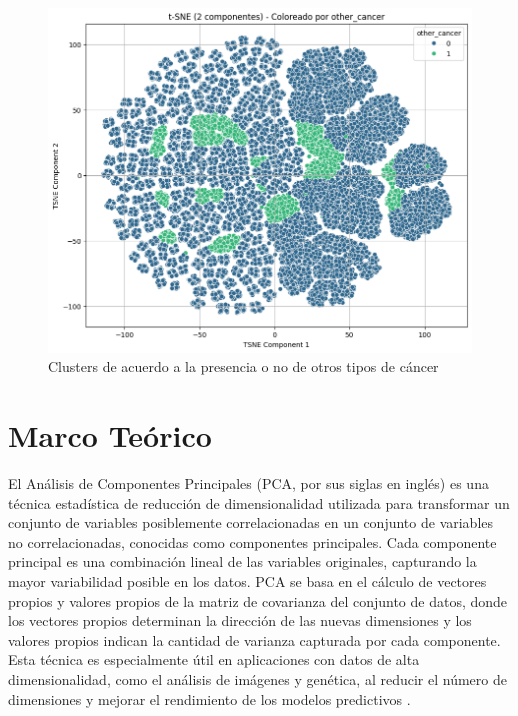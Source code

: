 \documentclass[10pt,journal,compsoc]{IEEEtran}
\begin{document}
\begin{figure}[htb]
    \centering
    \includegraphics[width=\linewidth]{imagenes/other_cancer.png}
    \caption{Clusters de acuerdo a la presencia o no de otros tipos de cáncer}
    \label{fig:tsne_other_cancer}
\end{figure}


\section{Marco Teórico}
El Análisis de Componentes Principales (PCA, por sus siglas en inglés) es una técnica estadística de reducción de dimensionalidad utilizada para transformar un conjunto de variables posiblemente correlacionadas en un conjunto de variables no correlacionadas, conocidas como componentes principales. Cada componente principal es una combinación lineal de las variables originales, capturando la mayor variabilidad posible en los datos. PCA se basa en el cálculo de vectores propios y valores propios de la matriz de covarianza del conjunto de datos, donde los vectores propios determinan la dirección de las nuevas dimensiones y los valores propios indican la cantidad de varianza capturada por cada componente. Esta técnica es especialmente útil en aplicaciones con datos de alta dimensionalidad, como el análisis de imágenes y genética, al reducir el número de dimensiones y mejorar el rendimiento de los modelos predictivos \cite{jolliffe2016pca}.
\end{document}
